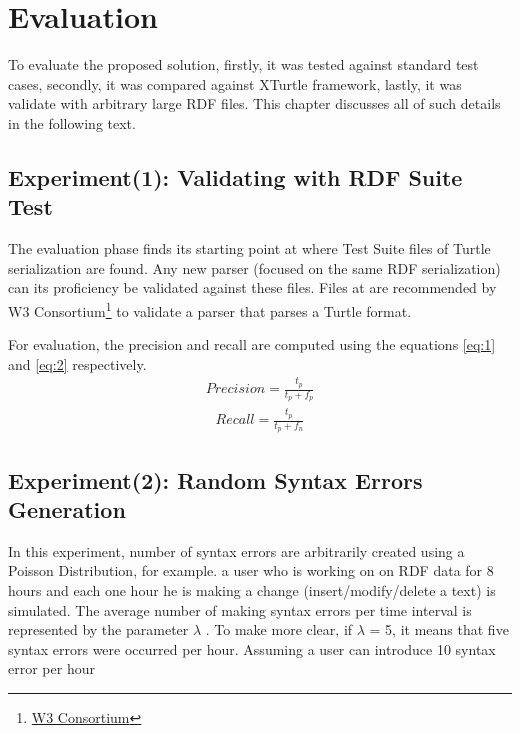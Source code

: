 \chapter{Evaluation}
\label{ch:evaluation}
To evaluate the proposed solution, firstly, it was tested against standard test cases, secondly, it was compared against XTurtle framework, lastly, it was validate with arbitrary large RDF files. This chapter discusses all of such details in the following text. 
\section{Experiment(1): Validating with RDF Suite Test}
The evaluation phase finds its starting point at \citealp{TurtleTests:Online} where Test Suite files of Turtle serialization are found. Any new parser (focused on the same RDF serialization) can its proficiency be validated against these files. Files at \citealp{TurtleTests:Online} are recommended by W3 Consortium\footnote{\href{https://www.w3.org/}{W3 Consortium}} to validate a parser that parses a Turtle format.  

For evaluation, the precision and recall are computed using the equations \ref{eq:1} and \ref{eq:2} respectively.  
\begin{align} 
   Precision=  \frac{t_p}{t_p+f_p} \label{eq:1}
\end{align}
\begin{align}
   Recall =  \frac{t_p}{t_p+f_n} \label{eq:2}
\end{align}

\section{Experiment(2): Random Syntax Errors Generation}
In this experiment, number of syntax errors are arbitrarily created using a Poisson Distribution, for example. a user who is working on on RDF data for 8 hours and each one hour he is making a change (insert/modify/delete a text) is simulated. The average number of making syntax errors per time interval is represented by the parameter $\lambda$ . To make more clear, if   $\lambda$ = 5, it means that five syntax errors were occurred per hour.  Assuming a user can introduce 10 syntax error per hour

